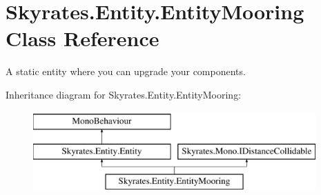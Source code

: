 \hypertarget{class_skyrates_1_1_entity_1_1_entity_mooring}{\section{Skyrates.\-Entity.\-Entity\-Mooring Class Reference}
\label{class_skyrates_1_1_entity_1_1_entity_mooring}
}


A static entity where you can upgrade your components.  


Inheritance diagram for Skyrates.\-Entity.\-Entity\-Mooring\-:\begin{figure}[H]
\begin{center}
\leavevmode
\includegraphics[height=3.000000cm]{class_skyrates_1_1_entity_1_1_entity_mooring}
\end{center}
\end{figure}
